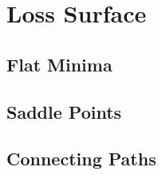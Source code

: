 
\chapter{Loss Surface}

\section{Flat Minima}

\textcite{hochreiterFlatMinima1997}

\section{Saddle Points}

\textcite{dauphinIdentifyingAttackingSaddle2014}

\section{Connecting Paths}

\textcite{garipovLossSurfacesMode2018} \textcite{izmailovAveragingWeightsLeads2019}



\endinput

